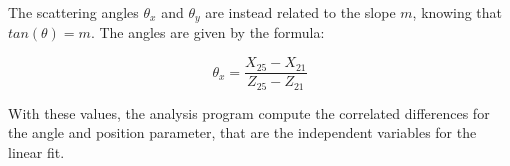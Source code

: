\begin{appendices}
The scattering angles $\theta_{x}$ and $\theta_{y}$ are instead related to the slope $m$, knowing that $tan(\theta) = m$. The angles are given by the formula:

\begin{equation}
\theta_{x} = \dfrac{X_{25} - X_{21}}{Z_{25} - Z_{21}}
\end{equation}

With these values, the analysis program compute the correlated differences for the angle and position parameter, that are the independent variables for the linear fit.


\end{appendices}